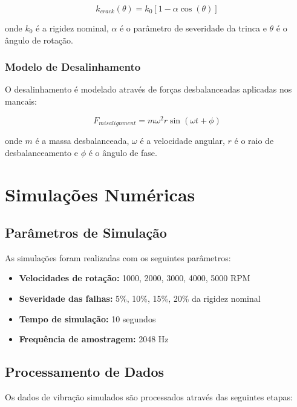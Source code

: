 \begin{equation}
k_{crack}(\theta) = k_0 \left[ 1 - \alpha \cos(\theta) \right]
\end{equation}

onde $k_0$ é a rigidez nominal, $\alpha$ é o parâmetro de severidade da trinca e $\theta$ é o ângulo de rotação.

\subsubsection{Modelo de Desalinhamento}

O desalinhamento é modelado através de forças desbalanceadas aplicadas nos mancais:

\begin{equation}
F_{misalignment} = m \omega^2 r \sin(\omega t + \phi)
\end{equation}

onde $m$ é a massa desbalanceada, $\omega$ é a velocidade angular, $r$ é o raio de desbalanceamento e $\phi$ é o ângulo de fase.

\section{Simulações Numéricas}

\subsection{Parâmetros de Simulação}

As simulações foram realizadas com os seguintes parâmetros:

\begin{itemize}
    \item \textbf{Velocidades de rotação:} 1000, 2000, 3000, 4000, 5000 RPM
    \item \textbf{Severidade das falhas:} 5\%, 10\%, 15\%, 20\% da rigidez nominal
    \item \textbf{Tempo de simulação:} 10 segundos
    \item \textbf{Frequência de amostragem:} 2048 Hz
\end{itemize}

\subsection{Processamento de Dados}

Os dados de vibração simulados são processados através das seguintes etapas:

